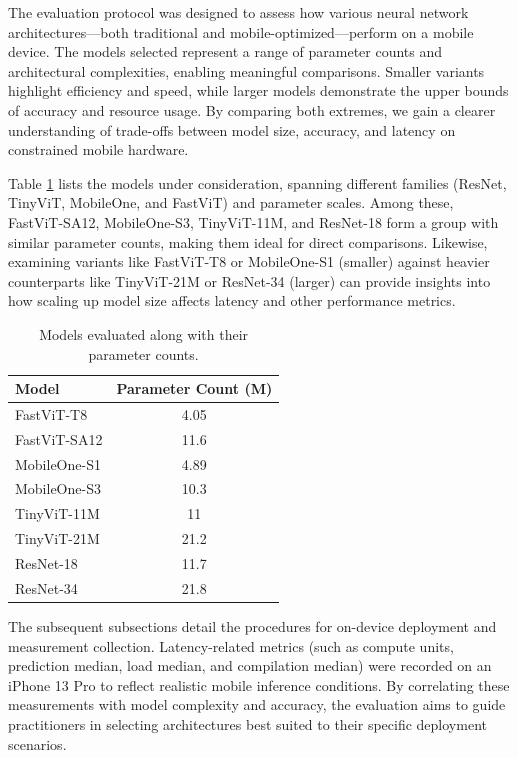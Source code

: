 \documentclass[12pt]{article}
\begin{document}
The evaluation protocol was designed to assess how various neural network architectures—both traditional and mobile-optimized—perform on a mobile device. The models selected represent a range of parameter counts and architectural complexities, enabling meaningful comparisons. Smaller variants highlight efficiency and speed, while larger models demonstrate the upper bounds of accuracy and resource usage. By comparing both extremes, we gain a clearer understanding of trade-offs between model size, accuracy, and latency on constrained mobile hardware.

Table \ref{tab:model_param_counts} lists the models under consideration, spanning different families (ResNet, TinyViT, MobileOne, and FastViT) and parameter scales. Among these, FastViT-SA12, MobileOne-S3, TinyViT-11M, and ResNet-18 form a group with similar parameter counts, making them ideal for direct comparisons. Likewise, examining variants like FastViT-T8 or MobileOne-S1 (smaller) against heavier counterparts like TinyViT-21M or ResNet-34 (larger) can provide insights into how scaling up model size affects latency and other performance metrics.

\begin{table}[tbp]
    \centering
    \doublespacing
    \captionsetup{justification=centering,margin=1cm}
    \begin{tabular}{l|c}
        \hline
        \textbf{Model} & \textbf{Parameter Count (M)} \\
        \hline
        FastViT-T8 & 4.05 \\
        FastViT-SA12 & 11.6 \\
        MobileOne-S1 & 4.89 \\
        MobileOne-S3 & 10.3 \\
        TinyViT-11M & 11 \\
        TinyViT-21M & 21.2 \\
        ResNet-18 & 11.7 \\
        ResNet-34 & 21.8 \\
        \hline
    \end{tabular}
    \caption{Models evaluated along with their parameter counts.}
    \label{tab:model_param_counts}
\end{table}

The subsequent subsections detail the procedures for on-device deployment and measurement collection. Latency-related metrics (such as compute units, prediction median, load median, and compilation median) were recorded on an iPhone 13 Pro to reflect realistic mobile inference conditions. By correlating these measurements with model complexity and accuracy, the evaluation aims to guide practitioners in selecting architectures best suited to their specific deployment scenarios.
\end{document}
